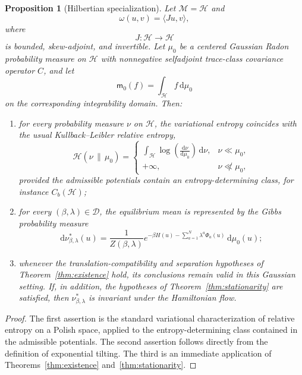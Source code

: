 \documentclass[11pt,reqno]{amsart}
\newtheorem{Proposition}[Theorem]{Proposition}
\begin{document}
\begin{Proposition}[Hilbertian specialization]
\label{prop:hilbertian}
Let $\mathcal M=\mathscr H$ and
\[
\omega(u,v)=\langle Ju,v\rangle,
\]
where
\[
J\colon\mathscr H\longrightarrow\mathscr H
\]
is bounded, skew-adjoint, and invertible. Let $\mu_0$ be a centered
Gaussian Radon probability measure on $\mathscr H$ with nonnegative
selfadjoint trace-class covariance operator $C$, and let
\[
\mathsf m_0(f)
=
\int_{\mathscr H}f\,\mathrm d\mu_0
\]
on the corresponding integrability domain. Then:
\begin{enumerate}
\item[\textup{(1)}] for every probability measure $\nu$ on
$\mathscr H$, the variational entropy coincides with the usual
Kullback--Leibler relative entropy,
\[
\mathcal H(\nu\,\|\,\mu_0)
=
\begin{cases}
\displaystyle
\int_{\mathscr H}
\log\left(\frac{\mathrm d\nu}{\mathrm d\mu_0}\right)
\,\mathrm d\nu,
&
\nu\ll\mu_0,
\\[2ex]
+\infty,
&
\nu\not\ll\mu_0,
\end{cases}
\]
provided the admissible potentials contain an entropy-determining
class, for instance $C_b(\mathscr H)$;

\item[\textup{(2)}] for every $(\beta,\lambda)\in\mathcal D$, the
equilibrium mean is represented by the Gibbs probability measure
\[
\mathrm d\nu_{\beta,\lambda}^{*}(u)
=
\frac{1}{Z(\beta,\lambda)}
e^{-\beta H(u)-\sum_{a=1}^{N}\lambda^a\Phi_a(u)}
\,\mathrm d\mu_0(u);
\]

\item[\textup{(3)}] whenever the translation-compatibility and
separation hypotheses of Theorem~\ref{thm:existence} hold, its
conclusions remain valid in this Gaussian setting. If, in addition, the
hypotheses of Theorem~\ref{thm:stationarity} are satisfied, then
$\nu_{\beta,\lambda}^{*}$ is invariant under the Hamiltonian flow.
\end{enumerate}
\end{Proposition}

\begin{proof}
The first assertion is the standard variational characterization of
relative entropy on a Polish space, applied to the entropy-determining
class contained in the admissible potentials. The second assertion
follows directly from the definition of exponential tilting. The third
is an immediate application of
Theorems~\ref{thm:existence} and~\ref{thm:stationarity}.
\end{proof}
\end{document}
